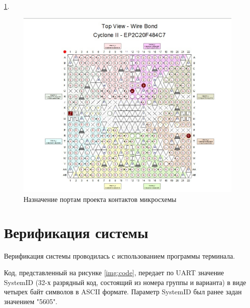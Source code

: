  \ref{img:planner}.

\begin{figure}[H]
	\begin{center}
		\includegraphics[scale=0.45]{img/planner.jpeg}
	\end{center}
	\captionsetup{justification=centering}
	\caption{Назначение портам проекта контактов микросхемы}
	\label{img:planner}
\end{figure}

\chapter{Верификация системы}

Верификация системы проводилась с использованием программы терминала.

Код, представленный на рисунке \ref{img:code},  передает по UART значение SystemID (32-х разрядный код, состоящий из номера группы и варианта) в виде четырех байт символов в ASCII формате. Параметр SystemID был ранее задан значением "5605".

